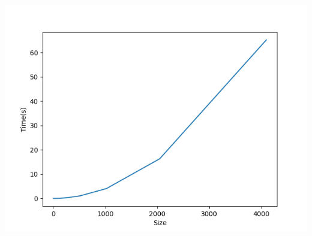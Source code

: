 \documentclass[]{article}
\begin{document}
\includegraphics[scale=0.5]{cc_time_p=1.png}\\
\end{document}
